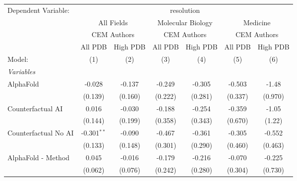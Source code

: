 \begingroup
\centering
\begin{tabular}{lcccccc}
   \tabularnewline \midrule \midrule
   Dependent Variable: & \multicolumn{6}{c}{resolution}\\
 & \multicolumn{2}{c}{All Fields} & \multicolumn{2}{c}{Molecular Biology} & \multicolumn{2}{c}{Medicine} \\
\cmidrule(lr){2-3} \cmidrule(lr){4-5} \cmidrule(lr){6-7}
 & \multicolumn{2}{c}{CEM Authors} & \multicolumn{2}{c}{CEM Authors} & \multicolumn{2}{c}{CEM Authors} \\
\cmidrule(lr){2-3} \cmidrule(lr){4-5} \cmidrule(lr){6-7}
 & \multicolumn{1}{c}{All PDB} & \multicolumn{1}{c}{High PDB} & \multicolumn{1}{c}{All PDB} & \multicolumn{1}{c}{High PDB} & \multicolumn{1}{c}{All PDB} & \multicolumn{1}{c}{High PDB} \\
\cmidrule(lr){2-2} \cmidrule(lr){3-3} \cmidrule(lr){4-4} \cmidrule(lr){5-5} \cmidrule(lr){6-6} \cmidrule(lr){7-7}
   Model:                                                     & (1)           & (2)          & (3)         & (4)         & (5)     & (6)\\  
   \midrule
   \emph{Variables}\\
   AlphaFold                                                  & -0.028        & -0.137       & -0.249      & -0.305      & -0.503  & -1.48\\   
                                                              & (0.139)       & (0.160)      & (0.222)     & (0.281)     & (0.337) & (0.970)\\   
   Counterfactual AI                                          & 0.016         & -0.030       & -0.188      & -0.254      & -0.359  & -1.05\\   
                                                              & (0.144)       & (0.199)      & (0.358)     & (0.343)     & (0.670) & (1.22)\\   
   Counterfactual No AI                                       & -0.301$^{**}$ & -0.090       & -0.467      & -0.361      & -0.305  & -0.552\\   
                                                              & (0.133)       & (0.148)      & (0.301)     & (0.290)     & (0.460) & (0.463)\\   
   AlphaFold - Method                                         & 0.045         & -0.016       & -0.179      & -0.216      & -0.070  & -0.225\\   
                                                              & (0.062)       & (0.076)      & (0.242)     & (0.280)     & (0.304) & (0.730)\\   

\end{tabular}
